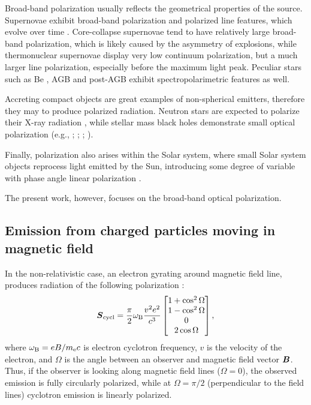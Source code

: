 Broad-band polarization usually reflects the geometrical properties of the source.
Supernovae exhibit broad-band polarization and polarized line features, which evolve over time \citep{Wang2008}.
Core-collapse supernovae tend to have relatively large broad-band polarization, which is likely caused by the asymmetry of explosions, while thermonuclear supernovae display very low continuum polarization, but a much larger line polarization, especially before the maximum light peak.
Peculiar stars such as Be \citep{Poeckert1979}, \gls{AGB} and post-\gls{AGB} \citep{Bieging2006} exhibit spectropolarimetric features as well.


Accreting compact objects are great examples of non-spherical emitters, therefore they may to produce polarized radiation.
Neutron stars are expected to polarize their X-ray radiation \citep[see, e.g., ][ for estimates]{Viironen2004, Loktev2020}, while stellar mass black holes demonstrate small optical polarization (e.g., \citealt{Russell2016}; \paperII; \paperIV; \inprepmaxi).

Finally, polarization also arises within the Solar system, where small Solar system objects reprocess light emitted by the Sun, introducing some degree of variable with phase angle linear polarization \citep[e.g.,][]{GoidetDevel1995, Penttila2005, Belskaya2019}.

The present work, however, focuses on the broad-band optical polarization.

\subsection{Emission from charged particles moving in magnetic field}
In the non-relativistic case, an electron gyrating around magnetic field line, produces radiation of the following polarization \citep{Ginzburg1964}: 
\begin{equation}
    \boldsymbol{S}_{\mathrm{cycl}} = \frac{\pi}{2} \omega_{\mathrm{B}} \frac{v^2 e^2}{c^3} 
    \begin{bmatrix}
    1 + \cos^2\Omega\\
    1 - \cos^2\Omega \\
    0 \\
    2 \cos \Omega    
    \end{bmatrix},
\end{equation}
where $\omega_{\mathrm{B}} = eB /m_{\mathrm{e}}c$ is electron cyclotron frequency, $v$ is the velocity of the electron, and $\Omega$ is the angle between an observer and magnetic field vector $\boldsymbol{B}$.
Thus, if the observer is looking along magnetic field lines ($\Omega = 0$), the observed emission is fully circularly polarized, while at $\Omega = \pi/2$ (perpendicular to the field lines) cyclotron emission is linearly polarized.

